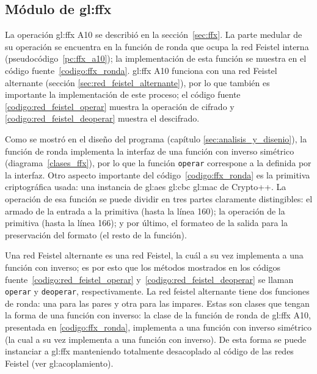 %
%
%

\subsection{Módulo de \texorpdfstring{\acrshort{gl:ffx}}{FFX}}

La operación \gls{gl:ffx} A10 se describió en la sección~\ref{sec:ffx}. La
parte medular de su operación se encuentra en la función de ronda que ocupa
la red Feistel interna (pseudocódigo~\ref{pc:ffx_a10}); la implementación de
esta función se muestra en el código fuente~\ref{codigo:ffx_ronda}.
\gls{gl:ffx} A10 funciona con una red Feistel alternante (sección
\ref{sec:red_feistel_alternante}), por lo que también es importante la
implementación de este proceso; el código fuente
\ref{codigo:red_feistel_operar} muestra la operación de cifrado y
\ref{codigo:red_feistel_deoperar} muestra el descifrado.


Como se mostró en el diseño del programa (capítulo
\ref{sec:analisis_y_disenio}), la función de ronda implementa la
interfaz de una función con inverso simétrico (diagrama~\ref{clases_ffx}), por
lo que la función \texttt{operar} correspone a la definida por la interfaz.
Otro aspecto importante del código~\ref{codigo:ffx_ronda} es la primitiva
criptográfica usada: una instancia de \gls{gl:aes} \gls{gl:cbc} \gls{gl:mac} de
Crypto++. La operación de esa función se puede dividir en tres partes
claramente distingibles: el armado de la entrada a la primitiva (hasta la línea
160); la operación de la primitiva (hasta la línea 166); y por último, el
formateo de la salida para la preservación del formato (el resto de la función).



Una red Feistel alternante es una red Feistel, la cuál a su vez implementa a
una función con inverso; es por esto que los métodos mostrados en los códigos
fuente~\ref{codigo:red_feistel_operar} y~\ref{codigo:red_feistel_deoperar} se
llaman \texttt{operar} y \texttt{deoperar}, respectivamente. La red feistel
alternante tiene dos funciones de  ronda: una para las pares y otra para las
impares. Estas son clases que  tengan la forma de una función con inverso: la
clase de la función de ronda de \gls{gl:ffx} A10, presentada en
\ref{codigo:ffx_ronda}, implementa a una función con inverso simétrico (la cual
a su vez implementa a una función con inverso). De esta forma se puede
instanciar a \gls{gl:ffx} manteniendo totalmente desacoplado al código de las
redes Feistel (ver \gls{gl:acoplamiento}).

